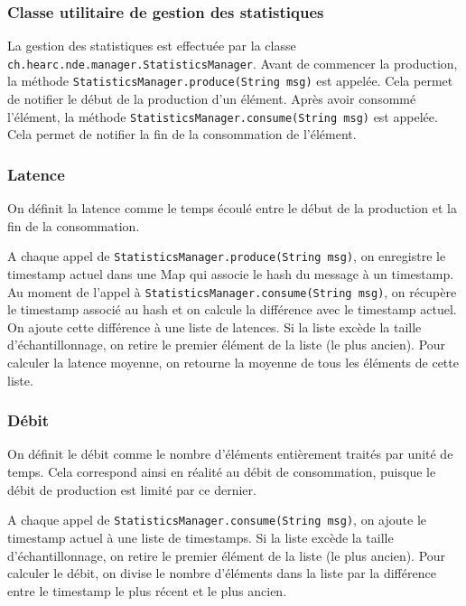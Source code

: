 \documentclass[
  french,
  a4paper,
]{scrartcl}
\begin{document}
\subsubsection*{Classe utilitaire de gestion des statistiques}

La gestion des statistiques est effectuée par la classe \lstinline{ch.hearc.nde.manager.StatisticsManager}. 
Avant de commencer la production, la méthode \lstinline{StatisticsManager.produce(String msg)} est appelée. 
Cela permet de notifier le début de la production d'un élément. Après avoir consommé l'élément, 
la méthode \lstinline{StatisticsManager.consume(String msg)} est appelée. Cela permet de notifier la fin
de la consommation de l'élément. 

\subsubsection*{Latence}

On définit la latence comme le temps écoulé entre le début de la production et la fin de la consommation. 

A chaque appel de \lstinline{StatisticsManager.produce(String msg)}, on enregistre le timestamp actuel dans une Map 
qui associe le hash du message à un timestamp. Au moment de l'appel à \lstinline{StatisticsManager.consume(String msg)},
on récupère le timestamp associé au hash et on calcule la différence avec le timestamp actuel. On ajoute 
cette différence à une liste de latences. Si la liste excède la taille d'échantillonnage, on retire le premier
élément de la liste (le plus ancien). 
Pour calculer la latence moyenne, on retourne la moyenne de tous les éléments de cette liste.

\subsubsection*{Débit}

On définit le débit comme le nombre d'éléments entièrement traités par unité de temps. Cela correspond
ainsi en réalité au débit de consommation, puisque le débit de production est limité par ce dernier.

A chaque appel de \lstinline{StatisticsManager.consume(String msg)}, on ajoute le timestamp actuel à une liste de
timestamps. Si la liste excède la taille d'échantillonnage, on retire le premier élément de la liste (le plus ancien). 
Pour calculer le débit, on divise le nombre d'éléments dans la liste par la différence entre le timestamp le plus récent et 
le plus ancien. 
\end{document}
